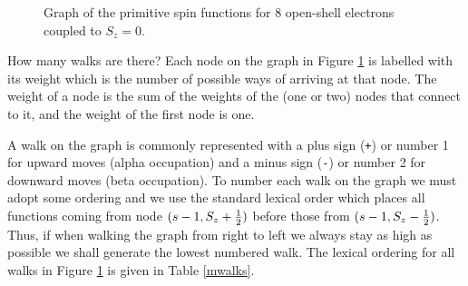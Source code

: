 \begin{figure}[htbp]

\center

\centerline{}
\caption{\label{mgraph} Graph of the primitive spin functions for 8
open-shell electrons coupled to $S_z=0$.}
\end{figure}

How many walks are there?  Each node on the graph in Figure
\ref{mgraph} is labelled with its weight which is the number of
possible ways of arriving at that node.  The weight of a node is the
sum of the weights of the (one or two) nodes that connect to it, and
the weight of the first node is one.  

A walk on the graph is commonly represented with a plus sign
(\verb=+=) or number 1 for upward moves (alpha occupation) and a minus
sign (\verb=-=) or number 2 for downward moves (beta occupation).  To
number each walk on the graph we must adopt some ordering and we use
the standard lexical order which places all functions coming from node
$(s-1,S_z+\frac{1}{2} )$ before those from $(s-1,S_z-\frac{1}{2} )$.
Thus, if when walking the graph from right to left we always stay as
high as possible we shall generate the lowest numbered walk.  The
lexical ordering for all walks in Figure \ref{mgraph} is given in
Table \ref{mwalks}.

